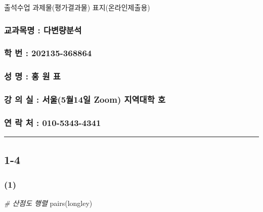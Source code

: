\documentclass[
]{article}
\author{}
\date{\vspace{-2.5em}}
\newenvironment{Shaded}{\begin{snugshade}}{\end{snugshade}}
\newcommand{\CommentTok}[1]{\textcolor[rgb]{0.56,0.35,0.01}{\textit{#1}}}
\newcommand{\FunctionTok}[1]{\textcolor[rgb]{0.00,0.00,0.00}{#1}}
\newcommand{\NormalTok}[1]{#1}
\begin{document}
출석수업 과제물(평가결과물) 표지(온라인제출용)

\hypertarget{uxad50uxacfcuxbaa9uxba85-uxb2e4uxbcc0uxb7c9uxbd84uxc11d}{%
\subsubsection{교과목명 :
다변량분석}\label{uxad50uxacfcuxbaa9uxba85-uxb2e4uxbcc0uxb7c9uxbd84uxc11d}}

\hypertarget{uxd559-uxbc88-202135-368864}{%
\subsubsection{학 번 :
202135-368864}\label{uxd559-uxbc88-202135-368864}}

\hypertarget{uxc131-uxba85-uxd64d-uxc6d0-uxd45c}{%
\subsubsection{성 명 : 홍 원
표}\label{uxc131-uxba85-uxd64d-uxc6d0-uxd45c}}

\hypertarget{uxac15-uxc758-uxc2e4-uxc11cuxc6b85uxc6d414uxc77c-zoom-uxc9c0uxc5eduxb300uxd559-uxd638}{%
\subsubsection{강 의 실 : 서울(5월14일 Zoom) 지역대학
호}\label{uxac15-uxc758-uxc2e4-uxc11cuxc6b85uxc6d414uxc77c-zoom-uxc9c0uxc5eduxb300uxd559-uxd638}}

\hypertarget{uxc5f0-uxb77d-uxcc98-010-5343-4341}{%
\subsubsection{연 락 처 :
010-5343-4341}\label{uxc5f0-uxb77d-uxcc98-010-5343-4341}}

\begin{center}\rule{0.5\linewidth}{0.5pt}\end{center}

\hypertarget{section}{%
\subsection{1-4}\label{section}}

\hypertarget{section-1}{%
\subsubsection{(1)}\label{section-1}}

\begin{Shaded}
\begin{Highlighting}[]
\CommentTok{\# 산점도 행렬}
\FunctionTok{pairs}\NormalTok{(longley)}
\end{Highlighting}
\end{Shaded}
\end{document}

